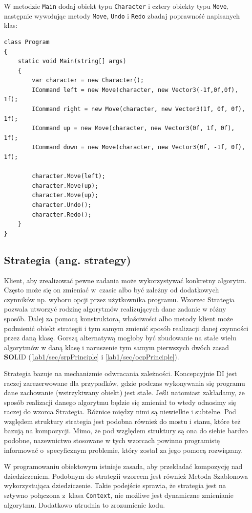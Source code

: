 W metodzie \texttt{Main} dodaj obiekt typu \texttt{Character} i cztery obiekty typu \texttt{Move}, następnie wywołując metody \texttt{Move}, \texttt{Undo} i \texttt{Redo} zbadaj poprawność napisanych klas:
\begin{lstlisting}
class Program
{
	static void Main(string[] args)
	{
		var character = new Character();
		ICommand left = new Move(character, new Vector3(-1f,0f,0f), 1f);
		ICommand right = new Move(character, new Vector3(1f, 0f, 0f), 1f);
		ICommand up = new Move(character, new Vector3(0f, 1f, 0f), 1f);
		ICommand down = new Move(character, new Vector3(0f, -1f, 0f), 1f);
		
		character.Move(left);
		character.Move(up);
		character.Move(up);
		character.Undo();
		character.Redo();
	}
}
\end{lstlisting}

\subsection{Strategia (ang. strategy)}\label{lab4/sec/strategy}

Klient, aby zrealizować pewne zadania może wykorzystywać konkretny algorytm. Często może się on zmieniać w~czasie albo być zależny od dodatkowych czynników np. wyboru opcji przez użytkownika programu. Wzorzec Strategia pozwala utworzyć rodzinę algorytmów realizujących dane zadanie w różny sposób. Dalej za pomocą konstruktora, właściwości albo metody klient może podmienić obiekt strategii i tym samym zmienić sposób realizacji danej czynności przez daną klasę. Gorszą alternatywą mogłoby być zbudowanie na stałe wielu algorytmów w daną klasę i naruszenie tym samym pierwszych dwóch zasad \textbf{SO}LID (\ref{lab1/sec/srpPrinciple} i \ref{lab1/sec/ocpPrinciple}).

Strategia bazuje na mechanizmie odwracania zależności. Koncepcyjnie DI jest raczej zarezerwowane dla przypadków, gdzie podczas wykonywania się programu dane zachowanie (wstrzykiwany obiekt) jest stałe. Jeśli natomiast zakładamy, że sposób realizacji danego algorytmu będzie się zmieniał to wtedy odnosimy się raczej do wzorca Strategia. Różnice między nimi są niewielkie i subtelne. Pod względem struktury strategia jest podobna również do mostu i stanu, które też bazują na kompozycji. Mimo, że pod względem struktury są ona do siebie bardzo podobne, nazewnictwo stosowane w tych wzorcach powinno programistę informować o~specyficznym problemie, który został za jego pomocą rozwiązany.

W programowaniu obiektowym istnieje zasada, aby przekładać kompozycję nad dziedziczeniem. Podobnym do strategii wzorcem jest również Metoda Szablonowa wykorzystująca dziedziczenie. Takie podejście sprawia, że strategia jest na sztywno połączona z~klasa \texttt{Context}, nie możliwe jest dynamiczne zmienianie algorytmu. Dodatkowo utrudnia to zrozumienie kodu. 

